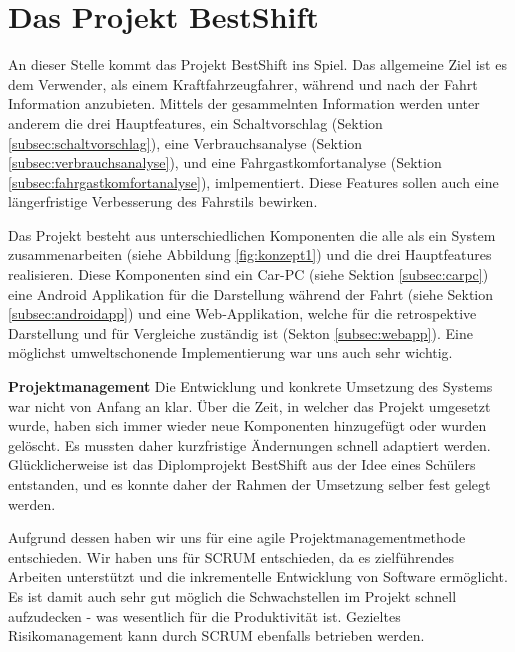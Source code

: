 \section{Das Projekt BestShift}
\label{sec:projektbestshift}

An dieser Stelle kommt das Projekt BestShift ins Spiel. Das allgemeine Ziel ist es dem Verwender, als einem Kraftfahrzeugfahrer, während und nach der Fahrt Information anzubieten. Mittels der gesammelnten Information werden unter anderem die drei Hauptfeatures, ein Schaltvorschlag (Sektion \ref{subsec:schaltvorschlag}), eine Verbrauchsanalyse (Sektion \ref{subsec:verbrauchsanalyse}), und eine Fahrgastkomfortanalyse (Sektion \ref{subsec:fahrgastkomfortanalyse}), imlpementiert. Diese Features sollen auch eine längerfristige Verbesserung des Fahrstils bewirken.

Das Projekt besteht aus unterschiedlichen Komponenten die alle als ein System zusammenarbeiten (siehe Abbildung \ref{fig:konzept1}) und die drei Hauptfeatures realisieren. Diese Komponenten sind ein Car-PC (siehe Sektion \ref{subsec:carpc}) eine Android Applikation für die Darstellung während der Fahrt (siehe Sektion \ref{subsec:androidapp}) und eine Web-Applikation, welche für die retrospektive Darstellung und für Vergleiche zuständig ist (Sekton \ref{subsec:webapp}). Eine möglichst umweltschonende Implementierung war uns auch sehr wichtig.

\textbf{Projektmanagement\newline}
Die Entwicklung und konkrete Umsetzung des Systems war nicht von Anfang an klar. Über die Zeit, in welcher das Projekt umgesetzt wurde, haben sich immer wieder neue Komponenten hinzugefügt oder wurden gelöscht. Es mussten daher kurzfristige Ändernungen schnell adaptiert werden. Glücklicherweise ist das Diplomprojekt BestShift aus der Idee eines Schülers entstanden, und es konnte daher der Rahmen der Umsetzung selber fest gelegt werden.

Aufgrund dessen haben wir uns für eine agile Projektmanagementmethode entschieden. Wir haben uns für SCRUM entschieden, da es zielführendes Arbeiten unterstützt und die inkrementelle Entwicklung von Software ermöglicht. Es ist damit auch sehr gut möglich die Schwachstellen im Projekt schnell aufzudecken - was wesentlich für die Produktivität ist. Gezieltes Risikomanagement kann durch SCRUM ebenfalls betrieben werden. 

